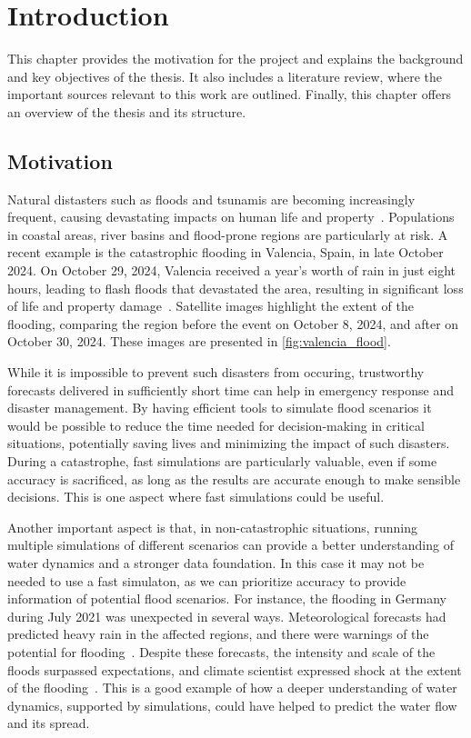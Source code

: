 \chapter{Introduction}
This chapter provides the motivation for the project and explains the background and key objectives of the thesis.
It also includes a literature review, where the important sources relevant to this work are outlined.
Finally, this chapter offers an overview of the thesis and its structure.

\section{Motivation}
Natural distasters such as floods and tsunamis are becoming increasingly frequent, causing devastating impacts on human life and property~\cite{najibi2018global_floods}.
Populations in coastal areas, river basins and flood-prone regions are particularly at risk.
A recent example is the catastrophic flooding in Valencia, Spain, in late October 2024.
On October 29, 2024, Valencia received a year's worth of rain in just eight hours, leading to flash floods that devastated the area, resulting in significant loss of life and property damage~\cite{valencia_flood_disaster_esa}.
Satellite images highlight the extent of the flooding, comparing the region before the event on October 8, 2024, and after on October 30, 2024.
These images are presented in \autoref{fig:valencia_flood}.

While it is impossible to prevent such disasters from occuring, trustworthy forecasts delivered in sufficiently short time can help in emergency response and disaster management.
By having efficient tools to simulate flood scenarios it would be possible to reduce the time needed for decision-making in critical situations, potentially saving lives and minimizing the impact of such disasters.
During a catastrophe, fast simulations are particularly valuable, even if some accuracy is sacrificed, as long as the results are accurate enough to make sensible decisions.
This is one aspect where fast simulations could be useful.

Another important aspect is that, in non-catastrophic situations, running multiple simulations of different scenarios can provide a better understanding of water dynamics and a stronger data foundation.
In this case it may not be needed to use a fast simulaton, as we can prioritize accuracy to provide information of potential flood scenarios.
For instance, the flooding in Germany during July 2021 was unexpected in several ways.
Meteorological forecasts had predicted heavy rain in the affected regions, and there were warnings of the potential for flooding~\cite{fathom_floods_2021}.
Despite these forecasts, the intensity and scale of the floods surpassed expectations, and climate scientist expressed shock at the extent of the flooding~\cite{guardian_floods_2021}.
This is a good example of how a deeper understanding of water dynamics, supported by simulations, could have helped to predict the water flow and its spread.

